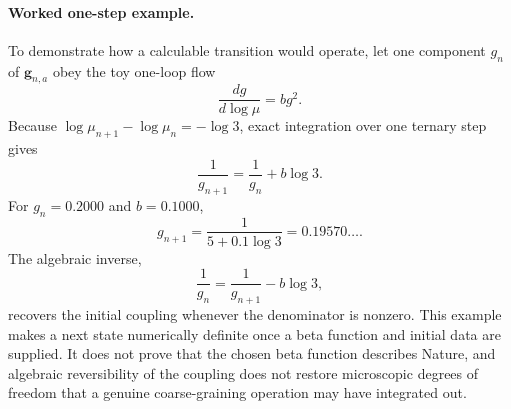 \documentclass[11pt]{amsart}
\theoremstyle{definition}
\theoremstyle{remark}
\begin{document}
\paragraph{Worked one-step example.}
To demonstrate how a calculable transition would operate, let one component $g_n$ of
$\mathbf g_{n,a}$ obey the toy one-loop flow
\begin{equation}\label{eq:toy-beta}
  \frac{dg}{d\log\mu}=b g^2.
\end{equation}
Because $\log\mu_{n+1}-\log\mu_n=-\log3$, exact integration over one ternary step gives
\begin{equation}\label{eq:toy-step}
  \frac{1}{g_{n+1}}=\frac{1}{g_n}+b\log3.
\end{equation}
For $g_n=0.2000$ and $b=0.1000$,
\begin{equation}
  g_{n+1}=\frac{1}{5+0.1\log3}=0.19570\ldots .
\end{equation}
The algebraic inverse,
\begin{equation}
  \frac{1}{g_n}=\frac{1}{g_{n+1}}-b\log3,
\end{equation}
recovers the initial coupling whenever the denominator is nonzero.  This example makes a next
state numerically definite once a beta function and initial data are supplied.  It does not prove
that the chosen beta function describes Nature, and algebraic reversibility of the coupling does
not restore microscopic degrees of freedom that a genuine coarse-graining operation may have
integrated out.
\end{document}
